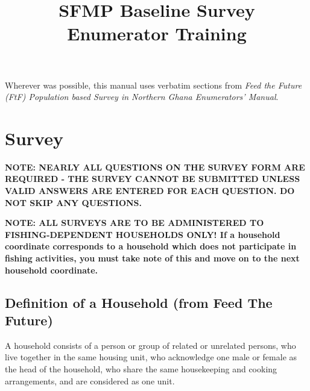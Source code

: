 \documentclass[a4paper]{refart}
\begin{document}
\title{SFMP Baseline Survey Enumerator Training}

\maketitle

Wherever was possible, this manual uses verbatim sections from \textit{Feed the Future (FtF) Population based Survey in Northern Ghana Enumerators' Manual}.

\section{Survey}

\textbf{NOTE: NEARLY ALL QUESTIONS ON THE SURVEY FORM ARE REQUIRED - THE SURVEY CANNOT BE SUBMITTED UNLESS VALID ANSWERS ARE ENTERED FOR EACH QUESTION. DO NOT SKIP ANY QUESTIONS.}

\textbf{NOTE: ALL SURVEYS ARE TO BE ADMINISTERED TO FISHING-DEPENDENT HOUSEHOLDS ONLY! If a household coordinate corresponds to a household which does not participate in fishing activities, you must take note of this and move on to the next household coordinate.}


\subsection{Definition of a Household (from Feed The Future)} 

A household consists of a person or group of related or unrelated persons, who live together in the same housing unit, who acknowledge one male or female as the head of the household, who share the same housekeeping and cooking arrangements, and are considered as one unit. 
\end{document}
